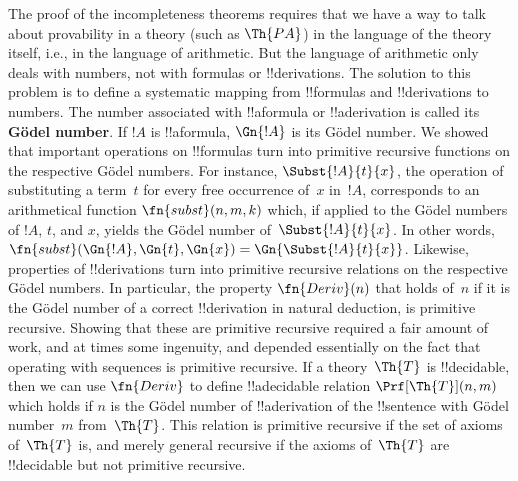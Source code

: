 The proof of the incompleteness theorems requires that we have a way
to talk about provability in a theory (such as $\Th{PA}$) in the
language of the theory itself, i.e., in the language of
arithmetic. But the language of arithmetic only deals with numbers,
not with formulas or !!{derivation}s.  The solution to this problem is
to define a systematic mapping from !!{formula}s and !!{derivation}s to
numbers. The number associated with !!a{formula} or !!a{derivation}
is called its \textbf{G\"odel number}.  If $!A$ is !!a{formula},
$\Gn{!A}$ is its G\"odel number. We showed that important operations on
!!{formula}s turn into primitive
recursive functions on the respective G\"odel
numbers. For instance, $\Subst{!A}{t}{x}$, the operation of
substituting a term~$t$ for every free occurrence of~$x$ in~$!A$,
corresponds to an arithmetical function $\fn{subst}(n,m,k)$ which, if
applied to the G\"odel numbers of $!A$, $t$, and $x$, yields the
G\"odel number of~$\Subst{!A}{t}{x}$. In other words,
$\fn{subst}(\Gn{!A}, \Gn{t}, \Gn{x}) = \Gn{\Subst{!A}{t}{x}}$.
Likewise, properties of !!{derivation}s
turn into primitive recursive relations on the respective G\"odel
numbers.  In particular, the property $\fn{Deriv}(n)$ that holds
of~$n$ if it is the G\"odel number of a correct !!{derivation} in
natural deduction, is primitive recursive.  Showing that these are
primitive recursive required a fair amount of work, and at times some
ingenuity, and depended essentially on the fact that operating with
sequences is primitive recursive.  If a theory~$\Th{T}$ is
!!{decidable}, then we can use $\fn{Deriv}$ to define !!a{decidable}
relation $\Prf[\Th{T}](n, m)$ which holds if $n$ is the G\"odel number
of !!a{derivation} of the !!{sentence} with G\"odel number~$m$
from~$\Th{T}$.  This relation is primitive recursive if the set of
axioms of~$\Th{T}$ is, and merely general recursive if the axioms
of~$\Th{T}$ are !!{decidable} but not primitive recursive.
